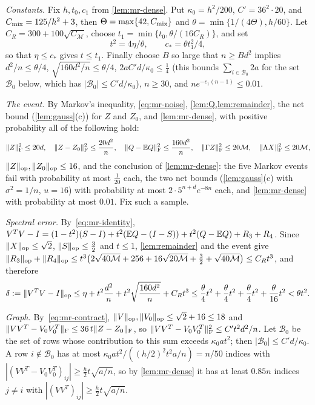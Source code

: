 \emph{Constants.} Fix $h,t_0,c_1$ from \cref{lem:mr-dense}. Put $\kappa_0=h^2/200$,
$C'=36^2\cdot20$, and
$C_{\rm mix}=125/h^2+3$, then $\Theta=\max\{42,C_{\rm mix}\}$ and
$\theta=\min\{1/(4\Theta),h/60\}$. Let $C_R=300+100\sqrt{C_{\mathcal M}}$, choose $t_1=\min\{t_0,\theta/(16C_R)\}$, and set
\[
 t^2=4\eta/\theta,\qquad c_*=\theta t_1^2/4,
\]
so that $\eta\le c_*$ gives $t\le t_1$. Finally choose $B$ so large that
$n\ge Bd^2$ implies $d^2/n\le\theta/4$, $\sqrt{160d^2/n}\le\theta/4$,
$2aC'd/\kappa_0\le\frac14$ (this bounds $\sum_{i\in \mathcal B_0}2a$ for the set $\mathcal B_0$
below, which has $|\mathcal B_0|\le C'd/\kappa_0$), $n\ge30$, and $ne^{-c_1(n-1)}\le0.01$.

\emph{The event.} By Markov's inequality, \eqref{eq:mr-noise},
\cref{lem:Q,lem:remainder}, the net bound (\cref{lem:gauss}(c)) for $Z$ and
$Z_0$, and \cref{lem:mr-dense}, with positive probability all of the following
hold:
\[
 \lVert Z\rVert_{\mathrm F}^2\le20d,\quad \lVert Z-Z_0\rVert_{\mathrm F}^2\le\frac{20d^2}n,\quad
 \lVert Q-\mathbb E Q\rVert_{\mathrm F}^2\le\frac{160d^2}n,\quad
 \lVert \Gamma Z\rVert_{\mathrm F}^2\le20\mathcal M,\quad \lVert \Lambda X\rVert_{\mathrm F}^2\le20\mathcal M,
\]
$\lVert Z\rVert_{\mathrm{op}},\lVert Z_0\rVert_{\mathrm{op}}\le16$, and the conclusion of \cref{lem:mr-dense}: the five Markov
events fail with probability at most $\frac1{20}$ each, the two net bounds
(\cref{lem:gauss}(c) with $\sigma^2=1/n$, $u=16$) with probability at most
$2\cdot5^{n+d}e^{-8n}$ each, and \cref{lem:mr-dense} with probability at most
$0.01$. Fix such a sample.

\emph{Spectral error.} By~\eqref{eq:mr-identity},
$V^TV-I=(1-t^2)(S-I)+t^2(\mathbb E Q-(I-S))+t^2(Q-\mathbb E Q)+R_3+R_4$. Since
$\lVert X\rVert_{\mathrm{op}}\le\sqrt2$, $\lVert S\rVert_{\mathrm{op}}\le\frac32$ and $t\le1$, \cref{lem:remainder} and the
event give
$\lVert R_3\rVert_{\mathrm{op}}+\lVert R_4\rVert_{\mathrm{op}}\le t^3\bigl(2\sqrt{40\mathcal M}+256+16\sqrt{20\mathcal M}
+\tfrac32+\sqrt{40\mathcal M}\bigr)\le C_Rt^3$, and therefore
\[
 \delta:=\lVert V^TV-I\rVert_{\mathrm{op}}\le\eta+t^2\frac{d^2}n+t^2\sqrt{\frac{160d^2}n}+C_Rt^3
 \le\frac\theta4t^2+\frac\theta4t^2+\frac\theta4t^2+\frac\theta{16}t^2<\theta t^2 .
\]

\emph{Graph.} By~\eqref{eq:mr-contract}, $\lVert V\rVert_{\mathrm{op}},\lVert V_0\rVert_{\mathrm{op}}\le\sqrt2+16\le18$
and
$\lVert VV^T-V_0V_0^T\rVert_{\mathrm F}\le36\,t\lVert Z-Z_0\rVert_{\mathrm F}$, so
$\lVert VV^T-V_0V_0^T\rVert_{\mathrm F}^2\le C't^2d^2/n$. Let $\mathcal B_0$ be the set of rows whose
contribution to this sum exceeds $\kappa_0at^2$; then $|\mathcal B_0|\le C'd/\kappa_0$. A row
$i\notin \mathcal B_0$ has at most $\kappa_0at^2/((h/2)^2t^2a/n)=n/50$ indices with
$|(VV^T-V_0V_0^T)_{ij}|\ge\frac h2t\sqrt{a/n}$, so by \cref{lem:mr-dense} it has at
least $0.85n$ indices $j\ne i$ with $|(VV^T)_{ij}|\ge\frac h2t\sqrt{a/n}$.

